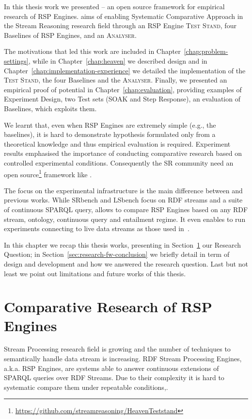 In this thesis work we presented \name -- an open source framework for empirical research of RSP Engines. \name aims of enabling Systematic Comparative Approach in the Stream Reasoning research field through an RSP Engine \textsc{Test Stand}, four Baselines of RSP Engines, and an \textsc{Analyser}. 

The motivations that led this work are included in Chapter~\ref{chap:problem-settings}, while in Chapter~\ref{chap:heaven} we described \name design and in Chapter~\ref{chap:implementation-experience} we detailed the implementation of the \textsc{Test Stand}, the four Baselines and the \textsc{Analyser}. Finally, we presented an empirical proof of \name potential in Chapter~\ref{chap:evaluation}, providing examples of Experiment Design, two Test sets (SOAK and Step Response), an evaluation of \name Baselines, which exploits them.

We learnt that, even when RSP Engines are extremely simple (e.g., the baselines), it is hard to demonstrate hypothesis formulated only from a theoretical knowledge and thus empirical evaluation is required. Experiment results emphasised the importance of conducting comparative research based on controlled experimental conditions. Consequently the SR community need an open source\footnote{\url{https://github.com/streamreasoning/HeavenTeststand}} framework like \namens.

The focus on the experimental infrastructure is the main difference between \name and previous works. While SRbench and LSbench focus on RDF streams and a suite of continuous SPARQL query, \name allows to compare RSP Engines based on any RDF stream, ontology, continuous query and entailment regime. It even enables to run experiments connecting to live data streams as those used in~\cite{DBLP:conf/semweb/BalduiniVDTPC13}.	

In this chapter we recap this thesis works, presenting in Section~\ref{sec:research-question-conclusion} our Research Question; in Section~\ref{sec:research-fw-conclusion} we briefly detail \namens in term of design and development and how we answered the research question. Last but not least we point out \name limitations and future works of this thesis.

\section{Comparative Research of RSP Engines}\label{sec:research-question-conclusion}

Stream Processing research field is growing and the number of techniques to semantically handle data stream is increasing. RDF Stream Processing Engines, a.k.a. RSP Engines, are systems able to answer continuous extensions of SPARQL queries over RDF Streams. Due to their complexity it is hard to systematic compare them under repeatable conditions,. 

